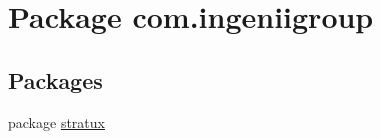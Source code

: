 \hypertarget{namespacecom_1_1ingeniigroup}{}\section{Package com.\+ingeniigroup}
\label{namespacecom_1_1ingeniigroup}
\subsection*{Packages}
\begin{DoxyCompactItemize}
\item 
package \hyperlink{namespacecom_1_1ingeniigroup_1_1stratux}{stratux}
\end{DoxyCompactItemize}
